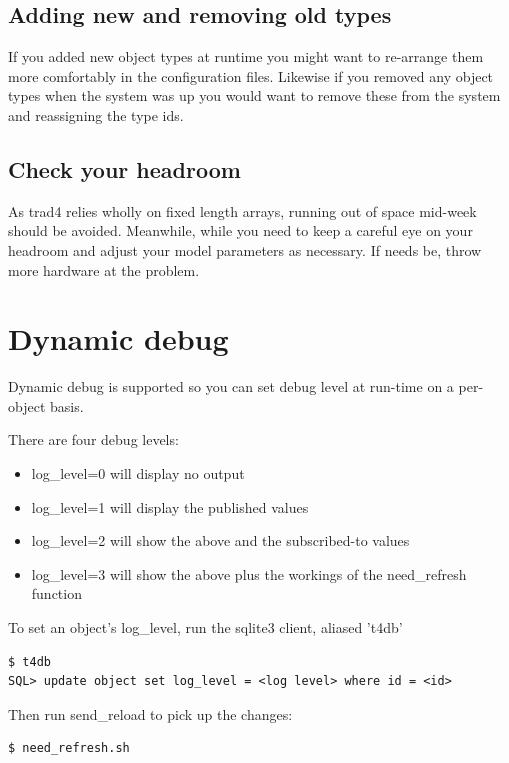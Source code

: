 \documentclass{report}
\begin{document}
\subsection{Adding new and removing old types}

If you added new object types at runtime you might want to re-arrange them more comfortably in the configuration files. Likewise if you removed any object types when the system was up you would want to remove these from the system and reassigning the type ids.

\subsection{Check your headroom}

As trad4 relies wholly on fixed length arrays, running out of space mid-week should be avoided.  Meanwhile, while you need to keep a careful eye on your headroom and adjust your model parameters as necessary. If needs be, throw more hardware at the problem.

\section{Dynamic debug}

Dynamic debug is supported so you can set debug level at run-time on a per-object basis. 

There are four debug levels:

\begin{itemize}
\item log_level=0 will display no output
\item log_level=1 will display the published values
\item log_level=2 will show the above and the subscribed-to values
\item log_level=3 will show the above plus the workings of the need_refresh function
\end{itemize}

To set an object's log_level, run the sqlite3 client, aliased 't4db'

\begin{verbatim}
$ t4db
SQL> update object set log_level = <log level> where id = <id>
\end{verbatim}

Then run send_reload to pick up the changes:

\begin{verbatim}
$ need_refresh.sh
\end{verbatim}
\end{document}
